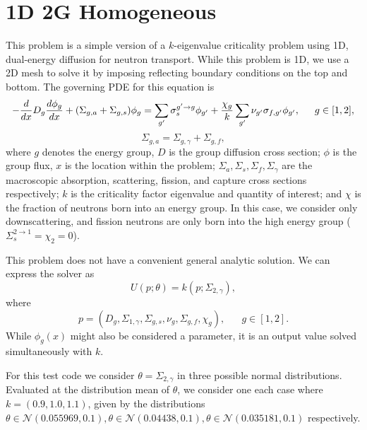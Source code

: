 \section{1D 2G Homogeneous}
This problem is a simple version of a $k$-eigenvalue criticality problem using 1D, dual-energy diffusion for neutron transport.  While this problem is 1D, we use a 2D mesh to solve it by imposing reflecting boundary conditions on the top and bottom.  The governing PDE for this equation is
\begin{equation}
-\frac{d }{d x}D_g\frac{d \phi_g}{d x}+(\Sigma_{g,a}+\Sigma_{g,s})\phi_g = \sum_{g'}\sigma_{s}^{g'\to g}\phi_{g'} + \frac{\chi_{g}}{k}\sum_{g'}\nu_{g'}\sigma_{f,g'}\phi_{g'},\hspace{15pt} g\in[1,2],
\end{equation}
\begin{equation}
\Sigma_{g,a}=\Sigma_{g,\gamma}+\Sigma_{g,f},
\end{equation}
where $g$ denotes the energy group, $D$ is the group diffusion cross section; $\phi$ is the group flux, $x$ is the location within the problem; $\Sigma_a,\Sigma_s,\Sigma_f,\Sigma_\gamma$ are the macroscopic absorption, scattering, fission, and capture cross sections respectively; $k$ is the criticality factor eigenvalue and quantity of interest; and $\chi$ is the fraction of neutrons born into an energy group.  In this case, we consider only downscattering, and fission neutrons are only born into the high energy group ($\Sigma_s^{2\to1}=\chi_2=0$).

This problem does not have a convenient general analytic solution.  We can express the solver as
\begin{equation}
U(p;\theta) = k(p;\Sigma_{2,\gamma}),
\end{equation}
where
\begin{equation}
p=(D_g,\Sigma_{1,\gamma},\Sigma_{g,s},\nu_g,\Sigma_{g,f},\chi_g),\hspace{20pt}g\in[1,2].
\end{equation}
While $\phi_g(x)$ might also be considered a parameter, it is an output value solved simultaneously with $k$.

For this test code we consider $\theta=\Sigma_{2,\gamma}$ in three possible normal distributions.  Evaluated at the distribution mean of $\theta$, we consider one each case where $k=(0.9,1.0,1.1)$, given by the distributions $\theta\in\mathcal{N}(0.055969,0.1), \theta\in\mathcal{N}(0.04438,0.1), \theta\in\mathcal{N}(0.035181,0.1)$ respectively.


